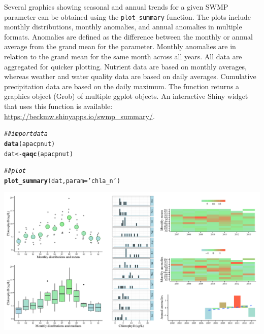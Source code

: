 \documentclass[10pt,letterpaper]{article}\usepackage[]{graphicx}\usepackage[]{color}
\makeatletter
\def\maxwidth{ %
  \ifdim\Gin@nat@width>\linewidth
    \linewidth
  \else
    \Gin@nat@width
  \fi
}
\newcommand{\hlstr}[1]{\textcolor[rgb]{0.192,0.494,0.8}{#1}}%
\newcommand{\hlcom}[1]{\textcolor[rgb]{0.678,0.584,0.686}{\textit{#1}}}%
\newcommand{\hlstd}[1]{\textcolor[rgb]{0.345,0.345,0.345}{#1}}%
\newcommand{\hlkwb}[1]{\textcolor[rgb]{0.69,0.353,0.396}{#1}}%
\newcommand{\hlkwc}[1]{\textcolor[rgb]{0.333,0.667,0.333}{#1}}%
\newcommand{\hlkwd}[1]{\textcolor[rgb]{0.737,0.353,0.396}{\textbf{#1}}}%
\newenvironment{kframe}{%
 \def\at@end@of@kframe{}%
 \ifinner\ifhmode%
  \def\at@end@of@kframe{\end{minipage}}%
  \begin{minipage}{\columnwidth}%
 \fi\fi%
 \def\FrameCommand##1{\hskip\@totalleftmargin \hskip-\fboxsep
 \colorbox{shadecolor}{##1}\hskip-\fboxsep
     \hskip-\linewidth \hskip-\@totalleftmargin \hskip\columnwidth}%
 \MakeFramed {\advance\hsize-\width
   \@totalleftmargin\z@ \linewidth\hsize
   \@setminipage}}%
 {\par\unskip\endMakeFramed%
 \at@end@of@kframe}
\newenvironment{knitrout}{}{} %
\makeatother
\begin{document}
Several graphics showing seasonal and annual trends for a given SWMP parameter can be obtained using the \texttt{plot\_summary} function.  The plots include monthly distributions, monthly anomalies, and annual anomalies in multiple formats.  Anomalies are defined as the difference between the monthly or annual average from the grand mean for the parameter.  Monthly anomalies are in relation to the grand mean for the same month across all years.  All data are aggregated for quicker plotting.  Nutrient data are based on monthly averages, whereas weather and water quality data are based on daily averages.  Cumulative precipitation data are based on the daily maximum. The function returns a graphics object (Grob) of multiple ggplot objects.  An interactive Shiny widget that uses this function is available: \href{https://beckmw.shinyapps.io/swmp_summary/}{https://beckmw.shinyapps.io/swmp\_summary/}.

\begin{knitrout}
\color{fgcolor}\begin{kframe}
\begin{alltt}
\hlcom{## import data}
\hlkwd{data}\hlstd{(apacpnut)}
\hlstd{dat} \hlkwb{<-} \hlkwd{qaqc}\hlstd{(apacpnut)}

\hlcom{## plot}
\hlkwd{plot_summary}\hlstd{(dat,} \hlkwc{param} \hlstd{=} \hlstr{'chla_n'}\hlstd{)}
\end{alltt}
\end{kframe}

{\centering \includegraphics[width=\maxwidth]{figure/unnamed-chunk-21} 

}



\end{knitrout}
\end{document}
